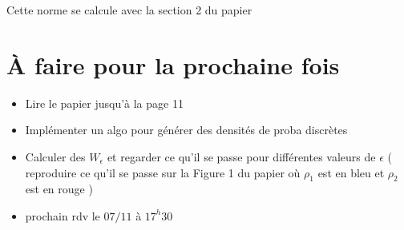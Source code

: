 \documentclass[11pt]{article}
\begin{document}
    Cette norme se calcule avec la section 2 du papier
    
    \newpage
    \section{À faire pour la prochaine fois}
    \begin{itemize}
    \item Lire le papier jusqu'à la page 11
    \item Implémenter un algo pour générer des densités de proba discrètes
    \item Calculer des $W_\epsilon$ et regarder ce qu'il se passe pour différentes valeurs de $\epsilon$ ( reproduire ce qu'il se passe sur la Figure 1 du papier où $\rho_1$ est en bleu et $\rho_2$ est en rouge ) 
    \item prochain rdv le $07/11$ à $17^h 30$
    \end{itemize}
    
    
    
    
    
  
\end{document}
